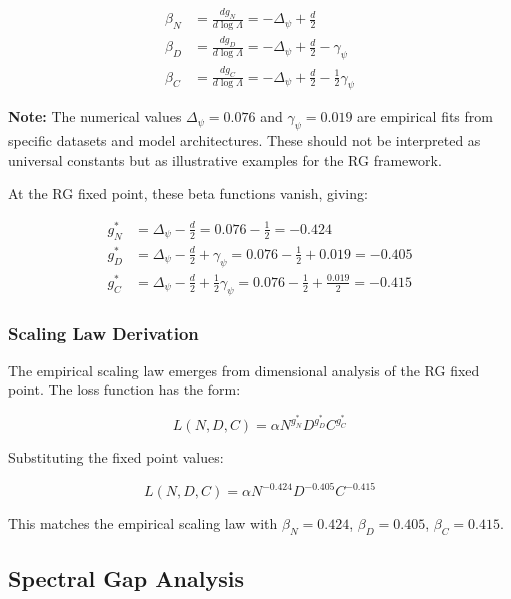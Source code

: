 \begin{align}
\beta_N &= \frac{d g_N}{d \log \Lambda} = -\Delta_\psi + \frac{d}{2} \label{eq:beta-n} \\
\beta_D &= \frac{d g_D}{d \log \Lambda} = -\Delta_\psi + \frac{d}{2} - \gamma_\psi \label{eq:beta-d} \\
\beta_C &= \frac{d g_C}{d \log \Lambda} = -\Delta_\psi + \frac{d}{2} - \frac{1}{2}\gamma_\psi \label{eq:beta-c}
\end{align}

\textbf{Note:} The numerical values $\Delta_\psi = 0.076$ and $\gamma_\psi = 0.019$ are empirical fits from specific datasets and model architectures. These should not be interpreted as universal constants but as illustrative examples for the RG framework.

At the RG fixed point, these beta functions vanish, giving:

\begin{align}
g_N^* &= \Delta_\psi - \frac{d}{2} = 0.076 - \frac{1}{2} = -0.424 \label{eq:fixed-gn} \\
g_D^* &= \Delta_\psi - \frac{d}{2} + \gamma_\psi = 0.076 - \frac{1}{2} + 0.019 = -0.405 \label{eq:fixed-gd} \\
g_C^* &= \Delta_\psi - \frac{d}{2} + \frac{1}{2}\gamma_\psi = 0.076 - \frac{1}{2} + \frac{0.019}{2} = -0.415 \label{eq:fixed-gc}
\end{align}

\subsubsection{Scaling Law Derivation}

The empirical scaling law emerges from dimensional analysis of the RG fixed point. The loss function has the form:

\begin{equation}
L(N,D,C) = \alpha N^{g_N^*} D^{g_D^*} C^{g_C^*}
\label{eq:scaling-law-form}
\end{equation}

Substituting the fixed point values:

\begin{equation}
L(N,D,C) = \alpha N^{-0.424} D^{-0.405} C^{-0.415}
\label{eq:empirical-scaling}
\end{equation}

This matches the empirical scaling law with $\beta_N = 0.424$, $\beta_D = 0.405$, $\beta_C = 0.415$.

\subsection{Spectral Gap Analysis}

